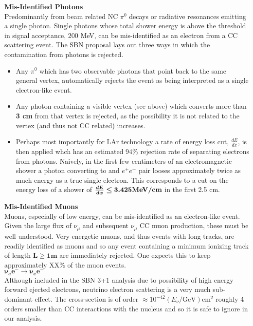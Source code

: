 \documentclass[12pt, a4paper]{article}
\begin{document}
{\bf Mis-Identified Photons} \\
Predominantly from beam related NC $\pi^0$ decays or radiative resonances emitting a single photon. Single photons whose total shower energy is above the threshold in signal acceptance, 200 MeV, can be mis-identified as an electron from a CC scattering event. The SBN proposal lays out three ways in which the contamination from photons is rejected. 
\begin{itemize}
	\item Any $\pi^0$ which has two observable photons that point back to the same general vertex, automatically rejects the event as being interpreted as a single electron-like event.
	\item Any photon containing a visible vertex (see above) which converts more than {\bf 3 cm} from that vertex is rejected, as the possibility it is not related to the vertex (and thus not CC related) increases. 
	\item Perhaps most importantly for LAr technology a rate of energy loss cut, $\frac{d E}{d x}$, is then applied whch has an estimated 94\% rejection rate of separating electrons from photons. Naively, in the first few centimeters of an electromagnetic shower a photon converting to and $e^+e^-$ pair looses approximately twice as much energy as a true single electron. This corresponds to a cut on the energy loss of a shower of ${\bm{\frac{d E}{d x} \leq 3.425 \text{\bf MeV/cm}}}$ in the first 2.5 cm.
\end{itemize}

{\bf Mis-Identified Muons}\\
Muons, especially of low energy, can be mis-identified as an electron-like event. Given the large flux of $\nu_\mu$ and subsequent $\nu_\mu$ CC muon production, these must be well understood. Very energetic muons, and thus events with long tracks, are readily identified as muons and so any event containing a  minimum ionizing track of length $\bm{L \geq 1m}$ are immediately rejected. One expects this to keep approximately XX\% of the muon events.\\

{\bf $\bm{\nu_e e^- \rightarrow \nu_e e^-}$} \\
Although included in the SBN 3+1 analysis due to possibility of high energy forward ejected electrons, neutrino electron scattering is a very much sub-dominant effect. The cross-section is of order $\approx 10^{-42}(E_\nu/\text{GeV})\text{cm}^2$ roughly 4 orders smaller than CC interactions with the nucleus and so it is safe to ignore in our analysis.
\end{document}
